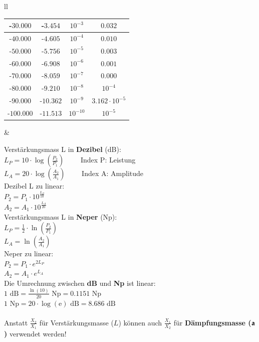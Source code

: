 \begin{tabular}{ll}
{\begin{tabular}{|c|c|c|c|}
			-$30.000$ & -$3.454$ & $10^{-3}$ & $0.032$ \\ \hline
			-$40.000$ & -$4.605$ & $10^{-4}$ & $0.010$ \\ \hline
			-$50.000$ & -$5.756$ & $10^{-5}$ & $0.003$ \\ \hline
			-$60.000$ & -$6.908$ & $10^{-6}$ & $0.001$ \\ \hline
			-$70.000$ & -$8.059$ & $10^{-7}$ & $0.000$ \\ \hline
			-$80.000$ & -$9.210$ & $10^{-8}$ & $10^{-4}$ \\ \hline
			-$90.000$ & -$10.362$ & $10^{-9}$ & $3.162 \cdot 10^{-5}$ \\ \hline
			-$100.000$ & -$11.513$ & $10^{-10}$ & $10^{-5}$ \\ \hline
		\end{tabular}
	}
	& \parbox{11.5cm}{
		\normalsize
		Verstärkungsmass L in \textbf{Dezibel} (dB):\\
		$L_P = 10 \cdot \log \left(\frac {P_2} {P_1}\right) \qquad$ Index P: Leistung \\
		$L_A = 20 \cdot \log \left(\frac {A_2} {A_1}\right) \qquad$ Index A: Amplitude \\ 
		
		Dezibel L zu linear: \\
		$P_2 = P_1 \cdot 10^{\frac{L_P}{10}} $ \\
		$A_2 = A_1 \cdot 10^{\frac{L_A}{20}} $ \\
		
		Verstärkungsmass L in \textbf{Neper} (Np):\\
		$L_P = \frac {1}{2} \cdot \ln \left(\frac {P_2} {P_1}\right)$\\
		$L_A = \ln \left(\frac {A_2} {A_1} \right)$ \\
		
		Neper zu linear: \\
		$P_2 = P_1 \cdot e^{2 L_P}$ \\
		$A_2 = A_1 \cdot e^{L_A}$ \\
		
		Die Umrechnung zwischen {\bf dB} und {\bf Np} ist linear: \\
		$1\mbox{~dB} = \frac {\ln(10)} {20} \mbox{~Np} = 0.1151\mbox{~Np}$ \\
		$1\mbox{~Np} = 20 \cdot \log(\mbox{e}) \mbox{~dB} = 8.686\mbox{~dB}$ \\ 
		\\
		Anstatt $\frac{X_2}{X_1}$ für Verstärkungsmasse ($L$) können auch
		$\frac{X_1}{X_2}$ für \textbf{Dämpfungsmasse ($\bf{a}$)} verwendet werden!
		
}
\end{tabular}

